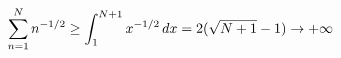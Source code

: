 \documentclass[preview]{standalone}
\begin{document}
\begin{align*}
\special{dvisvgm:raw <g id='unique000'>}\sum_{n=1}^Nn^{-1/2}\ge\int_1^{N+1}x^{-1/2}\,dx=2(\sqrt{N+1}-1)\to+\infty\special{dvisvgm:raw </g>}
\end{align*}
\end{document}
